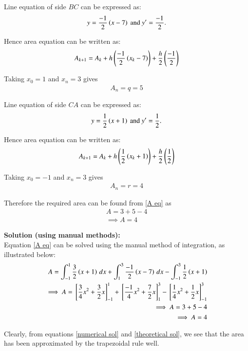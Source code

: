 \documentclass[journal]{IEEEtran}
\begin{document}
Line equation of side $BC$ can be expressed as:
\begin{align}
y = \frac{-1}{2}\left(x-7\right) \text{ and } y^{\prime} = \frac{-1}{2}.
\end{align}

Hence area equation can be written as:
\begin{align}
A_{k+1} = A_k + h\left(\frac{-1}{2}\left(x_k-7\right)\right) + \frac{h}{2}\left(\frac{-1}{2}\right)
\end{align}

Taking $x_0 = 1$ and $x_n = 3$ gives
\begin{align}
A_n = q = 5 \label{q}
\end{align}

Line equation of side $CA$ can be expressed as:
\begin{align}
y = \frac{1}{2}\left(x+1\right) \text{ and } y^{\prime} = \frac{1}{2}.
\end{align}

Hence area equation can be written as:
\begin{align}
A_{k+1} = A_k + h\left(\frac{1}{2}\left(x_k+1\right)\right) + \frac{h}{2}\left(\frac{1}{2}\right)
\end{align}

Taking $x_0 = -1$ and $x_n = 3$ gives
\begin{align}
A_n = r = 4 \label{r}
\end{align}

Therefore the required area can be found from \eqref{A eq} as
\begin{align}
A = 3+5-4 \\
\implies A = 4 \label{numerical sol}
\end{align}

\textbf{Solution (using manual methods):} \\
Equation \eqref{A eq} can be solved using the manual method of integration, as illustrated below:
\begin{align}
A = \int^{1}_{-1} \frac{3}{2}\left(x+1\right) \,dx + \int^{3}_{1} \frac{-1}{2}\left(x-7\right) \,dx - \int^{3}_{-1} \frac{1}{2}\left(x+1\right) \\
\implies A = {}\left[\frac{3}{4}x^2+\frac{3}{2}x\right]^{1}_{-1} + {}\left[\frac{-1}{4}x^2+\frac{7}{2}x\right]^{3}_{1} - {}\left[\frac{1}{4}x^2 + \frac{1}{2}x\right]^{3}_{-1} \\
\implies A = 3 + 5 - 4 \\
\implies A = 4 \label{theoretical sol}
\end{align}

Clearly, from equations \eqref{numerical sol} and \eqref{theoretical sol}, we see that the area has been approximated by the trapezoidal rule well. 
\end{document}
